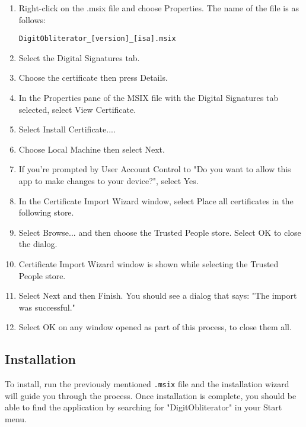 \begin{enumerate}
	\item Right-click on the .msix file and choose Properties. The name of the file is as follows:
	
	\texttt{DigitObliterator\_[version]\_[isa].msix}
	\item Select the Digital Signatures tab.
	\item Choose the certificate then press Details.
	\item In the Properties pane of the MSIX file with the Digital Signatures tab selected, select View Certificate.
	\item Select Install Certificate....
	\item Choose Local Machine then select Next.
	\item If you're prompted by User Account Control to "Do you want to allow this app to make changes to your device?", select Yes.
	\item In the Certificate Import Wizard window, select Place all certificates in the following store.
	\item Select Browse... and then choose the Trusted People store. Select OK to close the dialog.
	\item Certificate Import Wizard window is shown while selecting the Trusted People store.
	\item Select Next and then Finish. You should see a dialog that says: "The import was successful."
	\item Select OK on any window opened as part of this process, to close them all.
\end{enumerate}

\subsection{Installation}

To install, run the previously mentioned \texttt{.msix} file and the installation wizard will guide you through the process. Once installation is complete, you should be able to find the application by searching for "DigitObliterator" in your Start menu.


